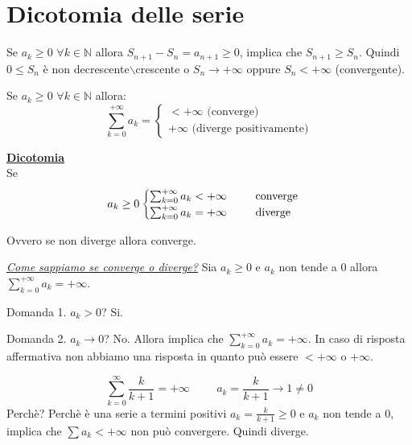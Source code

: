 \section{Dicotomia delle serie}
Se $a_k\geq0$ $\forall k\in\mathbb{N}$ allora $S_{n+1}-S_n=a_{n+1}\geq0$, implica che $S_{n+1}\geq S_n$. Quindi $0\leq S_n$ è non decrescente$\backslash$crescente o $S_n\to+\infty$ oppure $S_n<+\infty$ (convergente).

\begin{thm}
    Se $a_k\geq0$ $\forall k\in\mathbb{N}$ allora:
    \begin{equation*}
        \sum^{+\infty}_{k=0}a_k=\begin{cases}
            <+\infty \text{ (converge)}\\
            +\infty \text{ (diverge positivamente)}
        \end{cases}
    \end{equation*}
    
    \underline{\textbf{Dicotomia}}\\
    
    Se $$a_k\geq0\begin{cases}
        \sum^{+\infty}_{k=0}a_k<+\infty\hspace{0.9cm}\text{converge}\\
        \sum^{+\infty}_{k=0}a_k=+\infty\hspace{0.9cm}\text{diverge}
    \end{cases}$$
    
    Ovvero se non diverge allora converge.
\end{thm}

\textit{\underline{Come sappiamo se converge o diverge?}} Sia $a_k\geq0$ e $a_k$ non tende a $0$ allora $\sum^{+\infty}_{k=0}a_k=+\infty$.

Domanda 1. $a_k>0$? Si.

Domanda 2. $a_k\to0$? No. Allora implica che $\sum^{+\infty}_{k=0}a_k=+\infty$. In caso di risposta affermativa non abbiamo una risposta in quanto può essere $<+\infty$ o $+\infty$.

\begin{example}
    \begin{equation*}
        \sum^\infty_{k=0}\frac{k}{k+1}=+\infty\hspace{1cm}a_k=\frac{k}{k+1}\to1\neq0
    \end{equation*}
    Perchè? Perchè è una serie a termini positivi $a_k=\frac{k}{k+1}\geq0$ e $a_k$ non tende a $0$, implica che $\sum a_k<+\infty$ non può convergere. Quindi diverge.
\end{example}

